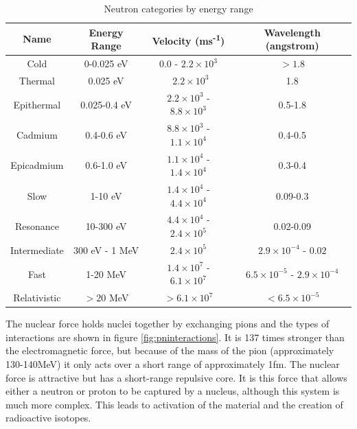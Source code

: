 \begin{table}[h]
\begin{center}
\renewcommand{\arraystretch}{1.2}
\begin{tabular}{c c c c}
\hline\hline
Name & Energy Range & Velocity (ms\textsuperscript{-1}) & Wavelength (angstrom) \\
\hline\hline
Cold & 0-0.025 eV & 0.0 - $2.2 \times 10^{3}$ &  $> 1.8$  \\
Thermal & 0.025 eV & ~$2.2 \times 10^{3}$ &  1.8  \\
Epithermal & 0.025-0.4 eV & $2.2 \times 10^{3}$ - $8.8 \times 10^{3}$ &  0.5-1.8 \\
Cadmium & 0.4-0.6 eV & $8.8 \times 10^{3}$ - $1.1 \times 10^4$ & 0.4-0.5  \\
Epicadmium & 0.6-1.0 eV & $1.1 \times 10^4$ - $1.4 \times 10^4$ & 0.3-0.4\\
Slow & 1-10 eV & $1.4 \times 10^4$ - $4.4 \times 10^4$   & 0.09-0.3\\
Resonance & 10-300 eV & $4.4 \times 10^4$ - $2.4 \times 10^5$ & 0.02-0.09\\
Intermediate & 300 eV - 1 MeV &  $2.4 \times 10^5$ & $2.9 \times 10^{-4}$ - $0.02$\\
Fast & 1-20 MeV & $1.4 \times 10^7$ - $6.1 \times 10^7$ & $6.5 \times 10^{-5}$ - $2.9 \times 10^{-4}$ \\
Relativistic & $>20$ MeV & $>6.1 \times 10^{7}$ & $< 6.5 \times 10^{-5}$\\
\hline\hline
\end{tabular}
\end{center}
\caption{Neutron categories by energy range \cite{njcarron}}
\label{table:neutronenergies}
\end{table}

The nuclear force holds nuclei together by exchanging pions and the types of interactions are shown in figure \ref{fig:pninteractions}.  It is 137 times stronger than the electromagnetic force, but because of the mass of the pion (approximately 130-140MeV) it only acts over a short range of approximately 1fm.  The nuclear force is attractive but has a short-range repulsive core.  It is this force that allows either a neutron or proton to be captured by a nucleus, although this system is much more complex.  This leads to activation of the material and the creation of radioactive isotopes.

